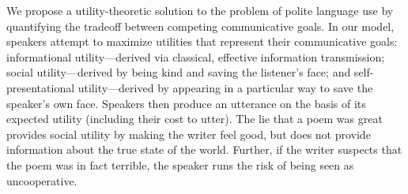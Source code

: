 \documentclass[9pt,twocolumn,twoside,lineno]{main_class_file}
\begin{document}
We propose a utility-theoretic solution to the problem of polite language use by quantifying the tradeoff between
competing communicative goals.
In our model, speakers attempt to maximize utilities that represent their communicative goals:
informational utility---derived via classical, effective
information transmission; social utility---derived by being kind and
saving the listener's face; and self-presentational utility---derived
by appearing in a particular way to save the speaker's own face.
Speakers then produce an utterance on the basis of
its expected utility (including their cost to utter).
The lie that a poem was great provides social utility by making the writer feel good, but does not provide information about the true state of the world.
Further, if the writer suspects that the poem was in fact terrible, the speaker runs the risk of being seen as uncooperative.


%
%
\end{document}
